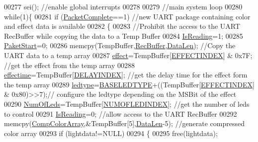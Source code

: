 \begin{DoxyCode}
{00277     sei();                                  \textcolor{comment}{//enable global interrupts}
00278 
00279     \textcolor{comment}{//main system loop}
00280     \textcolor{keywordflow}{while}(1)\{
00281         \textcolor{keywordflow}{if} (\hyperlink{globals_8h_a1b09d1a5bcf4c8ab435bb3c9e36def59}{PacketComplete}==1)    \textcolor{comment}{//new UART package containing color and effect data is
       available}
00282         \{
00283             \textcolor{comment}{//Prohibit the access to the UART RecBuffer while copying the data to a Temp Buffer}
00284             \hyperlink{globals_8h_a922ad5baed647eca43ad1a979e162ebd}{IsReading}=1;       
00285             \hyperlink{globals_8h_aaa3bddd2273257ac5ec259197b62e984}{PaketStart}=0;
00286             memcpy(TempBuffer,\hyperlink{globals_8h_a5d735865707e6694a8173d629e0b4d5c}{RecBuffer},\hyperlink{globals_8h_aaa611e00c18e950be43a4cd5ce0ceeb1}{DataLen});   \textcolor{comment}{//Copy the UART data to a temp array    }
00287             \hyperlink{globals_8h_a053b8e1f039c19251b90d60317db8aed}{effect}=TempBuffer[\hyperlink{ws2811lichterkette_8c_a8d4e4cf47dd6136ace963623e1a8e27c}{EFFECTINDEX}] & 0x7F; \textcolor{comment}{//get the effect from the temp array}
00288             \hyperlink{globals_8h_ac2445d316b2972d381edeac44bb6a226}{effectime}=TempBuffer[\hyperlink{ws2811lichterkette_8c_a9ff437877d0878dd16eacf103a1e1c40}{DELAYINDEX}];        \textcolor{comment}{//get the delay time for the effect
       form the temp array}
00289             \hyperlink{globals_8h_a722e1eb38b661d1338ada3cc7a4049a0}{ledtype}=\hyperlink{globals_8h_af07a5ce170c7be13d096843960e7b9da}{BASELEDTYPE}+((TempBuffer[\hyperlink{ws2811lichterkette_8c_a8d4e4cf47dd6136ace963623e1a8e27c}{EFFECTINDEX}] & 0x80)>>7);\textcolor{comment}{//
      configure the ledtype depending on the MSBit of the effect}
00290             \hyperlink{globals_8h_ad5db4045aed262ed4aae2af9d81fab98}{NumOfLeds}=TempBuffer[\hyperlink{ws2811lichterkette_8c_afbc75dc20761a05dda7cbb70b9b322dd}{NUMOFLEDINDEX}];  \textcolor{comment}{//get the number of leds to control}
00291             \hyperlink{globals_8h_a922ad5baed647eca43ad1a979e162ebd}{IsReading}=0;                           \textcolor{comment}{//allow access to the UART RecBuffer}
00292             memcpy(\hyperlink{globals_8h_a159854edb9d0c7283013495d85bdf997}{CompColorArray},&TempBuffer[5],\hyperlink{globals_8h_aaa611e00c18e950be43a4cd5ce0ceeb1}{DataLen}-5);   \textcolor{comment}{//generate compressed
       color array}
00293             \textcolor{keywordflow}{if} (lightdata!=NULL)
00294             \{
00295                 free(lightdata);
}
\end{DoxyCode}
